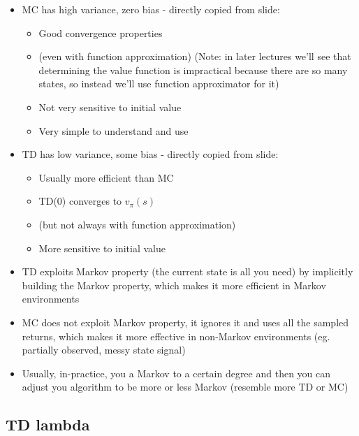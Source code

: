 \documentclass{article}
\begin{document}
\begin{itemize}
\begin{itemize}
\begin{itemize}
        \end{itemize}
        \item MC has high variance, zero bias - directly copied from slide:
        \begin{itemize}
            \item Good convergence properties
            \item (even with function approximation) (Note: in later lectures we'll see that determining the value function is impractical because there are so many states, so instead we'll use function approximator for it)
            \item Not very sensitive to initial value
            \item Very simple to understand and use
        \end{itemize}
        \item TD has low variance, some bias - directly copied from slide:
        \begin{itemize}
            \item Usually more efficient than MC
            \item TD(0) converges to $v_\pi(s)$
            \item (but not always with function approximation)
            \item More sensitive to initial value
        \end{itemize}
        \item TD exploits Markov property (the current state is all you need) by implicitly building the Markov property, which makes it more efficient in Markov environments
        \item MC does not exploit Markov property, it ignores it and uses all the sampled returns, which makes it more effective in non-Markov environments (eg. partially observed, messy state signal)
        \item Usually, in-practice, you a Markov to a certain degree and then you can adjust you algorithm to be more or less Markov (resemble more TD or MC)
    \end{itemize}
\end{itemize}

\subsection{TD lambda}
\end{document}
